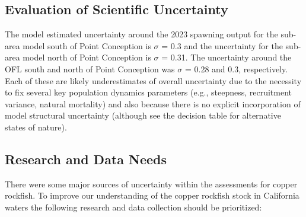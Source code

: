 \documentclass[11pt,
  letterpaper,
]{article}
\begin{document}
\subsection{Evaluation of Scientific Uncertainty}\label{evaluation-of-scientific-uncertainty}

The model estimated uncertainty around the 2023 spawning output for the sub-area model south of Point Conception is \(\sigma\) = 0.3 and the uncertainty for the sub-area model north of Point Conception is \(\sigma\) = 0.31. The uncertainty around the OFL south and north of Point Conception was \(\sigma\) = 0.28 and 0.3, respectively. Each of these are likely underestimates of overall uncertainty due to the necessity to fix several key population dynamics parameters (e.g., steepness, recruitment variance, natural mortality) and also because there is no explicit incorporation of model structural uncertainty (although see the decision table for alternative states of nature).

\subsection{Research and Data Needs}\label{research-and-data-needs}

There were some major sources of uncertainty within the assessments for copper rockfish. To improve our understanding of the copper rockfish stock in California waters the following research and data collection should be prioritized:
\end{document}
